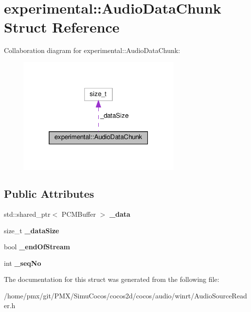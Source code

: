 \hypertarget{structexperimental_1_1AudioDataChunk}{}\section{experimental\+:\+:Audio\+Data\+Chunk Struct Reference}
\label{structexperimental_1_1AudioDataChunk}


Collaboration diagram for experimental\+:\+:Audio\+Data\+Chunk\+:
\nopagebreak
\begin{figure}[H]
\begin{center}
\leavevmode
\includegraphics[width=232pt]{structexperimental_1_1AudioDataChunk__coll__graph}
\end{center}
\end{figure}
\subsection*{Public Attributes}
\begin{DoxyCompactItemize}
\item 
\mbox{\label{structexperimental_1_1AudioDataChunk_aa539167859fe6cc1a8f1ce675c5e815b}} 
std\+::shared\+\_\+ptr$<$ P\+C\+M\+Buffer $>$ {\bfseries \+\_\+data}
\item 
\mbox{\label{structexperimental_1_1AudioDataChunk_aebc9225d7a5a857da2822b9cdf0c358b}} 
size\+\_\+t {\bfseries \+\_\+data\+Size}
\item 
\mbox{\label{structexperimental_1_1AudioDataChunk_a1076bb44ceecb7bebb3bfd830a6232aa}} 
bool {\bfseries \+\_\+end\+Of\+Stream}
\item 
\mbox{\label{structexperimental_1_1AudioDataChunk_aba61f059d671f92fddb16a4a452e3551}} 
int {\bfseries \+\_\+seq\+No}
\end{DoxyCompactItemize}


The documentation for this struct was generated from the following file\+:\begin{DoxyCompactItemize}
\item 
/home/pmx/git/\+P\+M\+X/\+Simu\+Cocos/cocos2d/cocos/audio/winrt/Audio\+Source\+Reader.\+h\end{DoxyCompactItemize}
